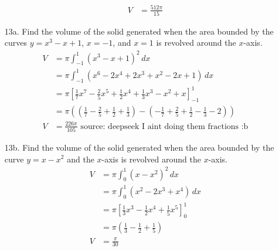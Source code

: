 \documentclass[12pt]{article}
\begin{document}
\begin{enumerate}
\begin{align*}
        V&=\frac{512\pi}{15}
    \end{align*}
    \item[13a.]Find the volume of the solid generated when the area bounded by the curves \( y = x^3 - x + 1 \), \( x = -1 \), and \( x = 1 \) is revolved around the \( x \)-axis.
    \begin{align*}
        V &= \pi \int_{-1}^{1} (x^3 - x + 1)^2 \, dx \\
        &= \pi \int_{-1}^{1} (x^6 - 2x^4 + 2x^3 + x^2 - 2x + 1) \, dx \\
        &= \pi \left[ \frac{1}{7}x^7 - \frac{2}{5}x^5 + \frac{1}{2}x^4 + \frac{1}{3}x^3 - x^2 + x \right]_{-1}^{1} \\
        &= \pi \left( \left( \frac{1}{7} - \frac{2}{5} + \frac{1}{2} + \frac{1}{3} \right) - \left( -\frac{1}{7} + \frac{2}{5} + \frac{1}{2} - \frac{1}{3} - 2 \right) \right) \\
       V &=\frac{226\pi}{105} \text{ source: deepseek I aint doing them fractions :b}
    \end{align*}
    \item[13b.]Find the volume of the solid generated when the area bounded by the curve \( y = x - x^2 \) and the \( x \)-axis is revolved around the \( x \)-axis.
    \begin{align*}
        V&= \pi \int_{0}^{1} (x - x^2)^2 \, dx \\
        &= \pi \int_{0}^{1} (x^2 - 2x^3 + x^4) \, dx \\
        &= \pi \left[ \frac{1}{3}x^3 - \frac{1}{2}x^4 + \frac{1}{5}x^5 \right]_{0}^{1} \\
        &= \pi \left( \frac{1}{3} - \frac{1}{2} + \frac{1}{5} \right) \\
        V&=\frac{\pi}{30}
    \end{align*}
\end{enumerate}

\newpage
\end{document}
